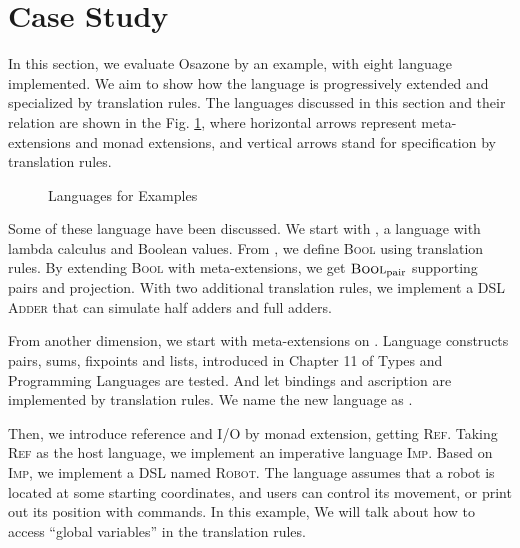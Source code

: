 \section{Case Study}\label{sec:eval}

In this section, we evaluate Osazone by an example, with eight language implemented.
We aim to show how the language is progressively extended and specialized by translation rules.
The languages discussed in this section and their relation are shown in the Fig. \ref{fig:langs},
 where horizontal arrows represent meta-extensions and monad extensions,
 and vertical arrows stand for specification by translation rules.

\begin{figure}
  
  \caption{Languages for Examples}
  \label{fig:langs}
\end{figure}

Some of these language have been discussed.
We start with \STLC, a language with lambda calculus and Boolean values.
From \STLC, we define \textsc{Bool} using translation rules.
By extending \textsc{Bool} with meta-extensions, we get $\textsc{Bool}_{\text{pair}}$ supporting pairs and projection.
With two additional translation rules, we implement a DSL \textsc{Adder} that can simulate half adders and full adders.

From another dimension, we start with meta-extensions on \STLC.
Language constructs pairs, sums, fixpoints and lists,
 introduced in Chapter 11 of Types and Programming Languages\cite{tapl} are tested.
And let bindings and ascription are implemented by translation rules.
We name the new language as \STLCex.

Then, we introduce reference and I/O by monad extension, getting \textsc{Ref}.
Taking \textsc{Ref} as the host language,
 we implement an imperative language \textsc{Imp}.
%
Based on \textsc{Imp}, we implement a DSL named \textsc{Robot}.
The language assumes that a robot is located at some starting coordinates,
 and users can control its movement, or print out its position with commands.
In this example, We will talk about how to access ``global variables'' in the translation rules.

